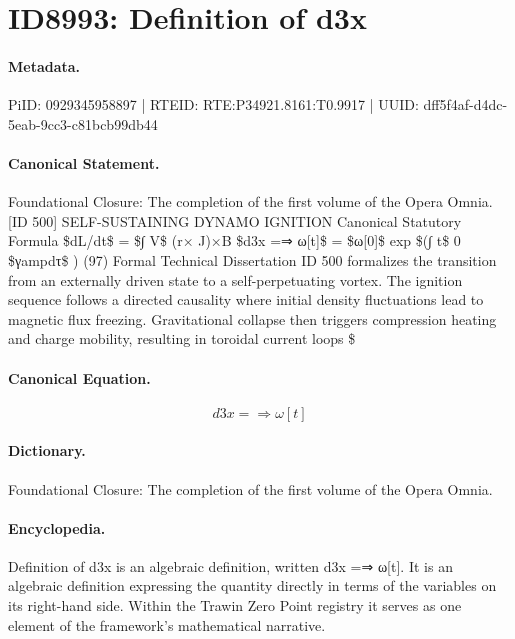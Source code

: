 \section*{ID8993: Definition of d3x}
\paragraph{Metadata.}
PiID: 0929345958897 | RTEID: RTE:P34921.8161:T0.9917 | UUID: dff5f4af-d4dc-5eab-9cc3-c81bcb99db44

\paragraph{Canonical Statement.}
Foundational Closure: The completion of the first volume of the Opera Omnia. [ID 500] SELF-SUSTAINING DYNAMO IGNITION Canonical Statutory Formula \$dL/dt\$ = \$∫ V\$ (r× J)×B \$d3x =⇒ ω[t]\$ = \$ω[0]\$ exp \$(∫ t\$ 0 \$γampdτ\$ ) (97) Formal Technical Dissertation ID 500 formalizes the transition from an externally driven state to a self-perpetuating vortex. The ignition sequence follows a directed causality where initial density fluctuations lead to magnetic flux freezing. Gravitational collapse then triggers compression heating and charge mobility, resulting in toroidal current loops \$

\paragraph{Canonical Equation.}
\[
d3x =⇒ ω[t]
\]

\paragraph{Dictionary.}
Foundational Closure: The completion of the first volume of the Opera Omnia.

\paragraph{Encyclopedia.}
Definition of d3x is an algebraic definition, written d3x =⇒ ω[t]. It is an algebraic definition expressing the quantity directly in terms of the variables on its right-hand side. Within the Trawin Zero Point registry it serves as one element of the framework's mathematical narrative.
